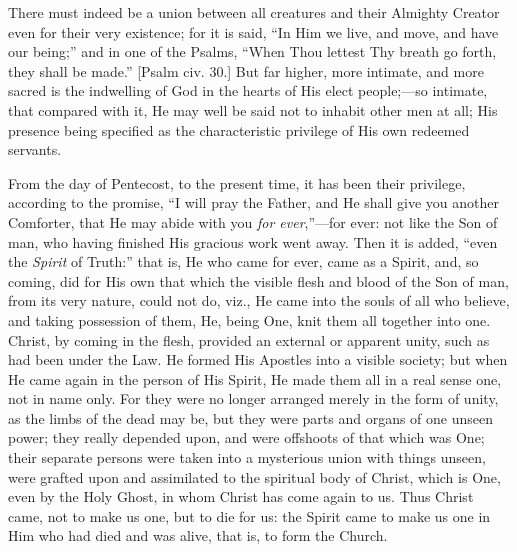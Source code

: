 There must indeed be a union between all creatures and their
Almighty Creator even for their very existence; for it is said,
``In Him we live, and move, and have our being;'' and in one
of the Psalms, ``When Thou lettest Thy breath go forth, they shall
be made.'' [Psalm civ. 30.] But far higher, more intimate, and
more sacred is the indwelling of God in the hearts of His elect
people;—so intimate, that compared with it, He may well be said not
to inhabit other men at all; His presence being specified as the
characteristic privilege of His own redeemed servants.

From the day of Pentecost, to the present time, it has been their
privilege, according to the promise, ``I will pray the Father, and
He shall give you another Comforter, that He may abide with you \emph{for
ever},''—for ever: not like the Son of man, who having
finished His gracious work went away. Then it is added, ``even the
\emph{Spirit} of Truth:'' that is, He who came for ever, came as a
Spirit, and, so coming, did for His own that which the visible flesh
and blood of the Son of man, from its very nature, could not do, viz.,
He came into the souls of all who believe, and taking possession of
them, He, being One, knit them all together into one. Christ, by
coming in the flesh, provided an external or apparent unity, such as
had been under the Law. He formed His Apostles into a visible society;
but when He came again in the person of His Spirit, He made them all
in a real sense one, not in name only. For they were no longer
arranged merely in the form of unity, as the limbs of the dead may be,
but they were parts and organs of one unseen power; they really
depended upon, and were offshoots of that which was One; their
separate persons were taken into a mysterious union with things unseen, were grafted upon and assimilated to the spiritual body of
Christ, which is One, even by the Holy Ghost, in whom Christ has come
again to us. Thus Christ came, not to make us one, but to die for us:
the Spirit came to make us one in Him who had died and was alive, that
is, to form the Church.

